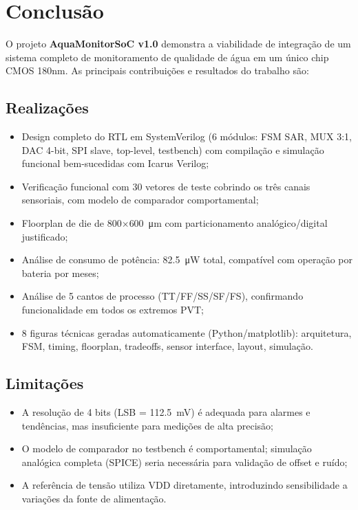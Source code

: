 \documentclass[12pt,a4paper]{article}
\begin{document}
\newpage

\section{Conclusão}
\label{sec:conclusao}

O projeto \textbf{AquaMonitorSoC v1.0} demonstra a viabilidade de integração
de um sistema completo de monitoramento de qualidade de água em um único chip
CMOS 180nm. As principais contribuições e resultados do trabalho são:

\subsection{Realizações}

\begin{itemize}
  \item Design completo do RTL em SystemVerilog (6 módulos: FSM SAR, MUX 3:1,
        DAC 4-bit, SPI slave, top-level, testbench) com compilação e simulação
        funcional bem-sucedidas com Icarus Verilog;
  \item Verificação funcional com 30 vetores de teste cobrindo os três canais
        sensoriais, com modelo de comparador comportamental;
  \item Floorplan de die de 800$\times$\SI{600}{\micro\meter} com particionamento
        analógico/digital justificado;
  \item Análise de consumo de potência: \SI{82.5}{\micro\watt} total, compatível
        com operação por bateria por meses;
  \item Análise de 5 cantos de processo (TT/FF/SS/SF/FS), confirmando
        funcionalidade em todos os extremos PVT;
  \item 8 figuras técnicas geradas automaticamente (Python/matplotlib): arquitetura,
        FSM, timing, floorplan, tradeoffs, sensor interface, layout, simulação.
\end{itemize}

\subsection{Limitações}

\begin{itemize}
  \item A resolução de 4 bits (LSB = \SI{112.5}{\milli\volt}) é adequada para
        alarmes e tendências, mas insuficiente para medições de alta precisão;
  \item O modelo de comparador no testbench é comportamental; simulação analógica
        completa (SPICE) seria necessária para validação de offset e ruído;
  \item A referência de tensão utiliza VDD diretamente, introduzindo sensibilidade
        a variações da fonte de alimentação.
\end{itemize}
\end{document}
